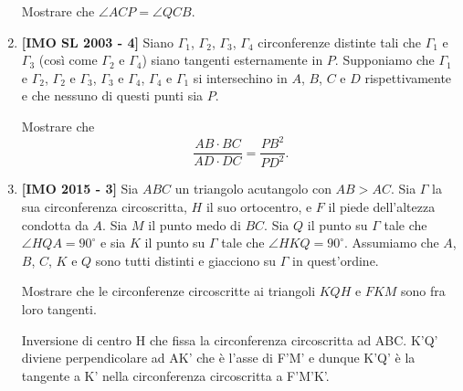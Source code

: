 \begin{enumerate}
	Mostrare che $\angle ACP = \angle QCB$.
	\item \textbf{[IMO SL 2003 - 4]}
	 Siano  $\Gamma_1$, $\Gamma_2$, $\Gamma_3$, $\Gamma_4$ 
	 circonferenze distinte tali che
	 $\Gamma_1$ e $\Gamma_3$ (così come $\Gamma_2$ e $\Gamma_4$) siano tangenti esternamente in $P$. Supponiamo che $\Gamma_1$ e $\Gamma_2$, $\Gamma_2$ e $\Gamma_3$, $\Gamma_3$ e $\Gamma_4$, $\Gamma_4$ e $\Gamma_1$ si intersechino in $A$, $B$, $C$ e $D$ rispettivamente e che nessuno di questi punti sia $P$.
	 
	 Mostrare che 
	 $$
	 \frac{AB\cdot BC}{AD\cdot DC}=\frac{PB^2}{PD^2} .
	 $$
	 
	 \item \textbf{[IMO 2015 - 3]} Sia $ABC$ un triangolo acutangolo con $AB > AC$. Sia $\Gamma$ la sua circonferenza circoscritta, $H$ il suo ortocentro, e $F$ il piede dell'altezza condotta da $A$. Sia $M$ il punto medo di $BC$. Sia $Q$ il punto su $\Gamma$ tale che $\angle HQA = 90^{\circ}$ e sia $K$ il punto su $\Gamma$ tale che $\angle HKQ = 90^{\circ}$. Assumiamo che $A$, $B$, $C$, $K$ e $Q$ sono tutti distinti e giacciono su $\Gamma$ in quest'ordine. 
	 
	 Mostrare che le circonferenze circoscritte ai triangoli $KQH$ e $FKM$ sono fra loro tangenti.
	 \begin{sol}Inversione di centro H che fissa la circonferenza circoscritta ad ABC. K'Q' diviene perpendicolare ad AK' che è l'asse di F'M' e dunque K'Q' è la tangente a K' nella circonferenza circoscritta a F'M'K'.
	 \end{sol}

		
\end{enumerate}
